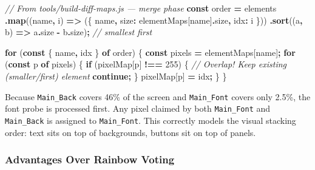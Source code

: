 \documentclass[
  11pt,
  oneside]{report}
\newenvironment{Shaded}{\begin{snugshade}}{\end{snugshade}}
\newcommand{\AttributeTok}[1]{\textcolor[rgb]{0.13,0.29,0.53}{#1}}
\newcommand{\CommentTok}[1]{\textcolor[rgb]{0.56,0.35,0.01}{\textit{#1}}}
\newcommand{\ControlFlowTok}[1]{\textcolor[rgb]{0.13,0.29,0.53}{\textbf{#1}}}
\newcommand{\DataTypeTok}[1]{\textcolor[rgb]{0.13,0.29,0.53}{#1}}
\newcommand{\DecValTok}[1]{\textcolor[rgb]{0.00,0.00,0.81}{#1}}
\newcommand{\FunctionTok}[1]{\textcolor[rgb]{0.13,0.29,0.53}{\textbf{#1}}}
\newcommand{\KeywordTok}[1]{\textcolor[rgb]{0.13,0.29,0.53}{\textbf{#1}}}
\newcommand{\NormalTok}[1]{#1}
\newcommand{\OperatorTok}[1]{\textcolor[rgb]{0.81,0.36,0.00}{\textbf{#1}}}
\begin{document}
\begin{Shaded}
\begin{Highlighting}[]
\CommentTok{// From tools/build{-}diff{-}maps.js — merge phase}
\KeywordTok{const}\NormalTok{ order }\OperatorTok{=}\NormalTok{ elements}
  \OperatorTok{.}\FunctionTok{map}\NormalTok{((name}\OperatorTok{,}\NormalTok{ i) }\KeywordTok{=\textgreater{}}\NormalTok{ (\{ name}\OperatorTok{,} \DataTypeTok{size}\OperatorTok{:}\NormalTok{ elementMaps[name]}\OperatorTok{.}\AttributeTok{size}\OperatorTok{,} \DataTypeTok{idx}\OperatorTok{:}\NormalTok{ i \}))}
  \OperatorTok{.}\FunctionTok{sort}\NormalTok{((a}\OperatorTok{,}\NormalTok{ b) }\KeywordTok{=\textgreater{}}\NormalTok{ a}\OperatorTok{.}\AttributeTok{size} \OperatorTok{{-}}\NormalTok{ b}\OperatorTok{.}\AttributeTok{size}\NormalTok{)}\OperatorTok{;} \CommentTok{// smallest first}

\ControlFlowTok{for}\NormalTok{ (}\KeywordTok{const}\NormalTok{ \{ name}\OperatorTok{,}\NormalTok{ idx \} }\KeywordTok{of}\NormalTok{ order) \{}
  \KeywordTok{const}\NormalTok{ pixels }\OperatorTok{=}\NormalTok{ elementMaps[name]}\OperatorTok{;}
  \ControlFlowTok{for}\NormalTok{ (}\KeywordTok{const}\NormalTok{ p }\KeywordTok{of}\NormalTok{ pixels) \{}
    \ControlFlowTok{if}\NormalTok{ (pixelMap[p] }\OperatorTok{!==} \DecValTok{255}\NormalTok{) \{}
      \CommentTok{// Overlap! Keep existing (smaller/first) element}
      \ControlFlowTok{continue}\OperatorTok{;}
\NormalTok{    \}}
\NormalTok{    pixelMap[p] }\OperatorTok{=}\NormalTok{ idx}\OperatorTok{;}
\NormalTok{  \}}
\NormalTok{\}}
\end{Highlighting}
\end{Shaded}

Because \texttt{Main\_Back} covers 46\% of the screen and
\texttt{Main\_Font} covers only 2.5\%, the font probe is processed
first. Any pixel claimed by both \texttt{Main\_Font} and
\texttt{Main\_Back} is assigned to \texttt{Main\_Font}. This correctly
models the visual stacking order: text sits on top of backgrounds,
buttons sit on top of panels.

\subsubsection{Advantages Over Rainbow
Voting}\label{advantages-over-rainbow-voting}
\end{document}
